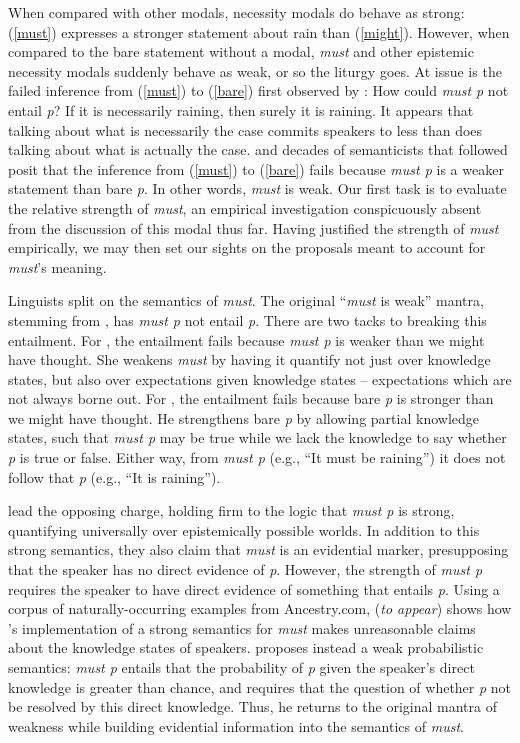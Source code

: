 \documentclass[10pt,letterpaper]{article}
\begin{document}
When compared with other modals, necessity modals do behave as strong: (\ref{must}) expresses a stronger statement about rain than (\ref{might}). However, when compared to the bare statement without a modal, \emph{must} and other epistemic necessity modals suddenly behave as weak, or so the liturgy goes.  At issue is the failed inference from (\ref{must}) to (\ref{bare}) first observed by : How could \emph{must p} not entail \emph{p}? If it is necessarily raining, then surely it is raining. It appears that talking about what is necessarily the case commits speakers to less than does talking about what is actually the case. \citeauthor{karttunen1972} and decades of semanticists that followed posit that the inference from (\ref{must}) to (\ref{bare}) fails because \emph{must p} is a weaker statement than bare \emph{p}. In other words, \emph{must} is weak. Our first task is to evaluate the relative strength of \emph{must}, an empirical investigation conspicuously absent from the discussion of this modal thus far. Having justified the strength of \emph{must} empirically, we may then set our sights on the proposals meant to account for \emph{must}'s meaning.

Linguists split on the semantics of \emph{must}. The original ``\emph{must} is weak'' mantra, stemming from , has \emph{must p} not entail \emph{p}. There are two tacks to breaking this entailment. For , the entailment fails because  \emph{must p} is weaker than we might have thought. She weakens \emph{must} by having it quantify not just over knowledge states, but also over expectations given knowledge states -- expectations which are not always borne out. For , the entailment fails because bare \emph{p} is stronger than we might have thought. He strengthens bare \emph{p} by allowing partial knowledge states, such that \emph{must p} may be true while we lack the knowledge to say whether \emph{p} is true or false. Either way, from \emph{must p} (e.g., ``It must be raining'') it does not follow that \emph{p} (e.g., ``It is raining'').

 lead the opposing charge, holding firm to the logic that \emph{must p} is strong, quantifying universally over epistemically possible worlds. In addition to this strong semantics, they also claim that \emph{must} is an evidential marker, presupposing that the speaker has no direct evidence of \emph{p}. However, the strength of \emph{must p} requires the speaker to have direct evidence of something that entails \emph{p}. Using a corpus of naturally-occurring examples from Ancestry.com, \citeauthor{lassiter2014salt} (\emph{to appear}) shows how \citeauthor{vonfintelgillies2010}'s implementation of a strong semantics for \emph{must} makes unreasonable claims about the knowledge states of speakers. \citeauthor{lassiter2014salt} proposes instead a weak probabilistic semantics: \emph{must p} entails that the probability of \emph{p} given the speaker's direct knowledge is greater than chance, and requires that the question of whether \emph{p} not be resolved by this direct knowledge. Thus, he returns to the original mantra of weakness while building evidential information into the semantics of \emph{must}.
\end{document}
